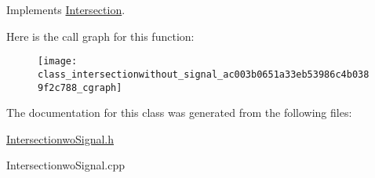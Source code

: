Implements \hyperlink{class_intersection_ade54ec591355782db542061623096a2f}{Intersection}.



Here is the call graph for this function\-:
\nopagebreak
\begin{figure}[H]
\begin{center}
\leavevmode
\texttt{[image: class\_intersectionwithout\_signal\_ac003b0651a33eb53986c4b0389f2c788\_cgraph]}
\end{center}
\end{figure}




The documentation for this class was generated from the following files\-:\begin{DoxyCompactItemize}
\item 
\hyperlink{_intersectionwo_signal_8h}{Intersectionwo\-Signal.\-h}\item 
Intersectionwo\-Signal.\-cpp\end{DoxyCompactItemize}
